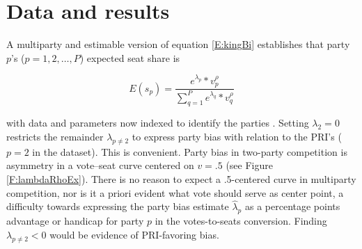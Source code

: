 \documentclass[letter,12pt]{article}
\begin{document}
\section{Data and results}


A multiparty and estimable version of equation \ref{E:kingBi} \citep{king.1990elRespBiasMultiparty} establishes that party $p$'s ($p=1,2,\ldots,P$) expected seat share is 

\begin{equation}\label{E:kingMulti}
 E(s_p) = \frac{e^{\lambda_p} * v_p^\rho}{\sum_{q=1}^{P} e^{\lambda_q} * v_q^\rho}
\end{equation}

\noindent with data and parameters now indexed to identify the parties \citep[another is][]{calvo.micozzi.govReform.2005}. Setting $\lambda_2 = 0$ restricts the remainder $\lambda_{p \neq 2}$ to express party bias with relation to the PRI's ($p=2$ in the dataset). This is convenient. Party bias in two-party competition is asymmetry in a vote--seat curve centered on $v=.5$ (see Figure \ref{F:lambdaRhoEx}). There is no reason to expect a .5-centered curve in multiparty competition, nor is it a priori evident what vote should serve as center point, a difficulty towards expressing the party bias estimate $\hat{\lambda}_p$ as a percentage points advantage or handicap for party $p$ in the votes-to-seats conversion. Finding $\lambda_{p \neq 2}<0$ would be evidence of PRI-favoring bias. %
\end{document}
